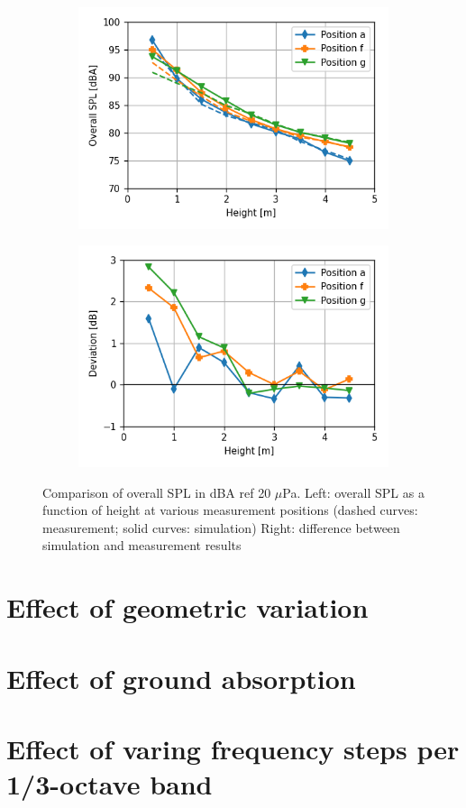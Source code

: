 \begin{figure}[H]
	\centering
	\begin{subfigure}[b]{0.49\textwidth}
		\centering
		\includegraphics[width=\textwidth]{fig/chap5/initial_model/overall_SPL/all_pos.png}
	\end{subfigure}
	\begin{subfigure}[b]{0.49\textwidth}
		\centering
		\includegraphics[width=\textwidth]{fig/chap5/initial_model/overall_SPL/deviation.png}
	\end{subfigure}
	\caption{Comparison of overall SPL in dBA ref 20 $\mu$Pa. Left: overall SPL as a function of height at various measurement positions (dashed curves: measurement; solid curves: simulation) Right: difference between simulation and measurement results}
	\label{fig:overall_SPL}
\end{figure}


\section{Effect of geometric variation}

\section{Effect of ground absorption}

\section{Effect of varing frequency steps per 1/3-octave band}